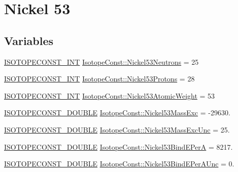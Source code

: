 \hypertarget{group___isotope_const-_nickel-_ni53}{}\section{Nickel 53}
\label{group___isotope_const-_nickel-_ni53}
\subsection*{Variables}
\begin{DoxyCompactItemize}
\item 
\mbox{\hyperlink{group___isotope_const-_macros_ga5f18360b3e99483a35c32d789e62621c}{I\+S\+O\+T\+O\+P\+E\+C\+O\+N\+S\+T\+\_\+\+I\+NT}} \mbox{\hyperlink{group___isotope_const-_nickel-_ni53_ga9a9075238cb50be7455352062ebf2fe3}{Isotope\+Const\+::\+Nickel53\+Neutrons}} = 25
\item 
\mbox{\hyperlink{group___isotope_const-_macros_ga5f18360b3e99483a35c32d789e62621c}{I\+S\+O\+T\+O\+P\+E\+C\+O\+N\+S\+T\+\_\+\+I\+NT}} \mbox{\hyperlink{group___isotope_const-_nickel-_ni53_gaac51826c05900d9144322167e4ebc2d0}{Isotope\+Const\+::\+Nickel53\+Protons}} = 28
\item 
\mbox{\hyperlink{group___isotope_const-_macros_ga5f18360b3e99483a35c32d789e62621c}{I\+S\+O\+T\+O\+P\+E\+C\+O\+N\+S\+T\+\_\+\+I\+NT}} \mbox{\hyperlink{group___isotope_const-_nickel-_ni53_ga1d73bb6838c464bc3968c7ae0869be75}{Isotope\+Const\+::\+Nickel53\+Atomic\+Weight}} = 53
\item 
\mbox{\hyperlink{group___isotope_const-_macros_ga8f45a7272ce02c0b4c65c44636ed719a}{I\+S\+O\+T\+O\+P\+E\+C\+O\+N\+S\+T\+\_\+\+D\+O\+U\+B\+LE}} \mbox{\hyperlink{group___isotope_const-_nickel-_ni53_ga825c1bc8edba54a8d75269cd23756699}{Isotope\+Const\+::\+Nickel53\+Mass\+Exc}} = -\/29630.
\item 
\mbox{\hyperlink{group___isotope_const-_macros_ga8f45a7272ce02c0b4c65c44636ed719a}{I\+S\+O\+T\+O\+P\+E\+C\+O\+N\+S\+T\+\_\+\+D\+O\+U\+B\+LE}} \mbox{\hyperlink{group___isotope_const-_nickel-_ni53_gacf2aa9deb0ed5dddc2246535ce187c2e}{Isotope\+Const\+::\+Nickel53\+Mass\+Exc\+Unc}} = 25.
\item 
\mbox{\hyperlink{group___isotope_const-_macros_ga8f45a7272ce02c0b4c65c44636ed719a}{I\+S\+O\+T\+O\+P\+E\+C\+O\+N\+S\+T\+\_\+\+D\+O\+U\+B\+LE}} \mbox{\hyperlink{group___isotope_const-_nickel-_ni53_gad5ef7374b78a901deacafd8af0dde3b4}{Isotope\+Const\+::\+Nickel53\+Bind\+E\+PerA}} = 8217.
\item 
\mbox{\hyperlink{group___isotope_const-_macros_ga8f45a7272ce02c0b4c65c44636ed719a}{I\+S\+O\+T\+O\+P\+E\+C\+O\+N\+S\+T\+\_\+\+D\+O\+U\+B\+LE}} \mbox{\hyperlink{group___isotope_const-_nickel-_ni53_gaacd19cee3d22dc3f0b03cc4bf975ee03}{Isotope\+Const\+::\+Nickel53\+Bind\+E\+Per\+A\+Unc}} = 0.

\end{DoxyCompactItemize}
